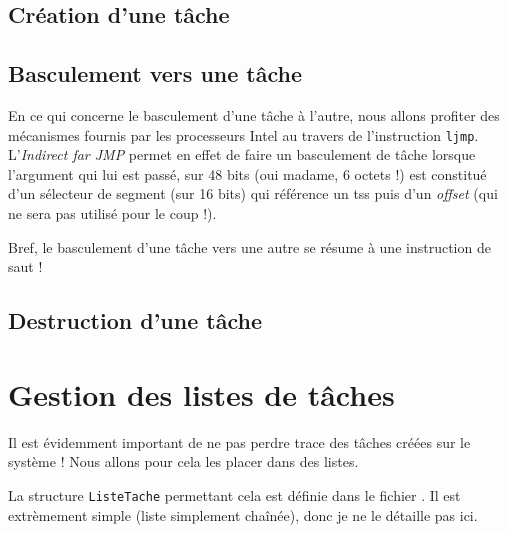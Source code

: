 \subsection{Création d'une tâche}

\subsection{Basculement vers une tâche}

   En ce qui concerne le basculement d'une tâche à l'autre, nous
allons profiter des mécanismes fournis par les processeurs Intel au
travers de l'instruction {\tt ljmp}. L'{\em Indirect far JMP} permet
en effet de faire un basculement de tâche lorsque l'argument qui lui
est passé, sur 48 bits (oui madame, 6 octets !) est constitué d'un
sélecteur de segment (sur 16 bits) qui référence un {\sc tss} puis
d'un {\em offset} (qui ne sera pas utilisé pour le coup !).

   Bref, le basculement d'une tâche vers une autre se résume à une
instruction de saut !

\subsection{Destruction d'une tâche}

\section{Gestion des listes de tâches}

   Il est évidemment important de ne pas perdre trace des tâches
créées sur le système ! Nous allons pour cela les placer dans des
listes.

   La structure \lstinline!ListeTache! permettant cela est définie
dans le fichier . Il est extrèmement
simple (liste simplement chaînée), donc je ne le détaille pas ici.

